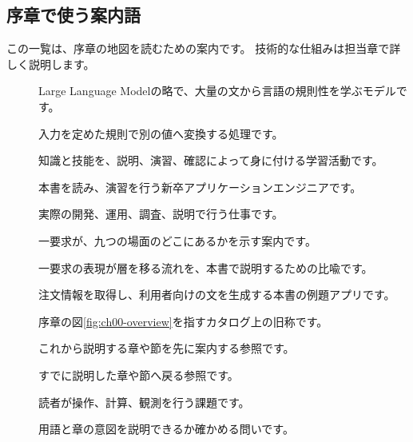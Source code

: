 \subsection*{序章で使う案内語}

この一覧は、序章の地図を読むための案内です。
技術的な仕組みは担当章で詳しく説明します。

\begin{description}
  \item[] Large Language Modelの略で、大量の文から言語の規則性を学ぶモデルです。
  \item[] 入力を定めた規則で別の値へ変換する処理です。
  \item[] 知識と技能を、説明、演習、確認によって身に付ける学習活動です。
  \item[] 本書を読み、演習を行う新卒アプリケーションエンジニアです。
  \item[] 実際の開発、運用、調査、説明で行う仕事です。
  \item[] 一要求が、九つの場面のどこにあるかを示す案内です。
  \item[] 一要求の表現が層を移る流れを、本書で説明するための比喩です。
  \item[] 注文情報を取得し、利用者向けの文を生成する本書の例題アプリです。
  \item[] 序章の図\ref{fig:ch00-overview}を指すカタログ上の旧称です。
  \item[] これから説明する章や節を先に案内する参照です。
  \item[] すでに説明した章や節へ戻る参照です。
  \item[] 読者が操作、計算、観測を行う課題です。
  \item[] 用語と章の意図を説明できるか確かめる問いです。
\end{description}
